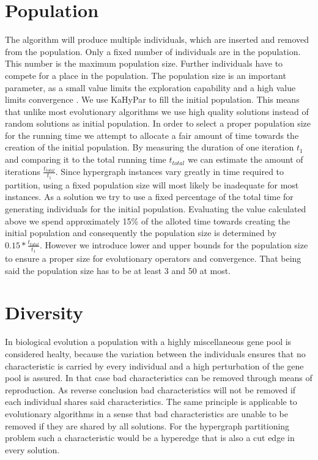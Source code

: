 \documentclass[a4paper,12pt,titlepage, BCOR7mm,headsepline]{scrbook}
\numberwithin{equation}{section}
\begin{document}
\section{Population}

The algorithm will produce multiple individuals, which are inserted and removed from the population. Only a fixed number of
individuals are in the population. This number is the maximum population size. Further individuals have to compete for a place in the population. 
The population size is an important parameter, as a small value limits the exploration capability and a high value limits convergence \cite{chen2012large}.
We use KaHyPar to fill the initial population. This means that unlike most evolutionary algorithms we use high quality solutions instead of random solutions as initial population.
In order to select a proper population size for the running time we attempt to allocate a fair amount of time towards the creation of the initial population. 
By measuring the duration of one iteration $t_1$ and comparing it to the total running time ${t_{total}}$ we can estimate the amount of iterations $\frac{t_{total}}{t_1}$. Since hypergraph instances
vary greatly in time required to partition, using a fixed population size will most likely be inadequate for most instances. As a solution we try to use a fixed percentage of the total time for generating 
individuals for the initial population. Evaluating the value calculated above we spend approximately 15\% of the alloted time towards creating the initial population and consequently the population size is determined by $0.15*\frac{t_{total}}{t_1}$.
However we introduce lower and upper bounds for the population size to ensure a proper size for evolutionary operators and convergence. That being said the population size has to be at least 3 and 50 at most.
\section{Diversity}
\label{sec:diversity}
In biological evolution a population with a highly miscellaneous gene pool is considered healty, because the variation between the individuals ensures that no characteristic is carried by every individual and a high perturbation of the gene pool is assured. In that case bad characteristics can be removed through means of reproduction. As reverse conclusion bad characteristics will not be removed if each individual shares said characteristics. 
The same principle is applicable to evolutionary algorithms in a sense that bad characteristics are unable to be removed if they are shared by all solutions. For the hypergraph partitioning problem such a characteristic would be a hyperedge that is also a cut edge in every solution. 
\end{document}
